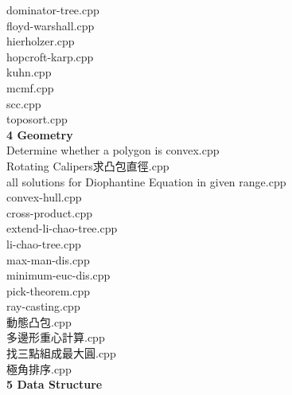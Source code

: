 dominator-tree.cpp \dotfill \pageref{sec:3_3_Graph_file7}\\
floyd-warshall.cpp \dotfill \pageref{sec:3_3_Graph_file8}\\
hierholzer.cpp \dotfill \pageref{sec:3_3_Graph_file9}\\
hopcroft-karp.cpp \dotfill \pageref{sec:3_3_Graph_file10}\\
kuhn.cpp \dotfill \pageref{sec:3_3_Graph_file11}\\
mcmf.cpp \dotfill \pageref{sec:3_3_Graph_file12}\\
scc.cpp \dotfill \pageref{sec:3_3_Graph_file13}\\
toposort.cpp \dotfill \pageref{sec:3_3_Graph_file14}\\
\vspace{0.7em}
\textbf{\Large 4 Geometry} \dotfill \pageref{sec:4_4_Geometry}\\
Determine whether a polygon is convex.cpp \dotfill \pageref{sec:4_4_Geometry_file0}\\
Rotating Calipers求凸包直徑.cpp \dotfill \pageref{sec:4_4_Geometry_file1}\\
all solutions for Diophantine Equation in given range.cpp \dotfill \pageref{sec:4_4_Geometry_file2}\\
convex-hull.cpp \dotfill \pageref{sec:4_4_Geometry_file3}\\
cross-product.cpp \dotfill \pageref{sec:4_4_Geometry_file4}\\
extend-li-chao-tree.cpp \dotfill \pageref{sec:4_4_Geometry_file5}\\
li-chao-tree.cpp \dotfill \pageref{sec:4_4_Geometry_file6}\\
max-man-dis.cpp \dotfill \pageref{sec:4_4_Geometry_file7}\\
minimum-euc-dis.cpp \dotfill \pageref{sec:4_4_Geometry_file8}\\
pick-theorem.cpp \dotfill \pageref{sec:4_4_Geometry_file9}\\
ray-casting.cpp \dotfill \pageref{sec:4_4_Geometry_file10}\\
動態凸包.cpp \dotfill \pageref{sec:4_4_Geometry_file11}\\
多邊形重心計算.cpp \dotfill \pageref{sec:4_4_Geometry_file12}\\
找三點組成最大圓.cpp \dotfill \pageref{sec:4_4_Geometry_file13}\\
極角排序.cpp \dotfill \pageref{sec:4_4_Geometry_file14}\\
\vspace{0.7em}
\textbf{\Large 5 Data Structure} \dotfill \pageref{sec:5_5_Data_Structure}\\
